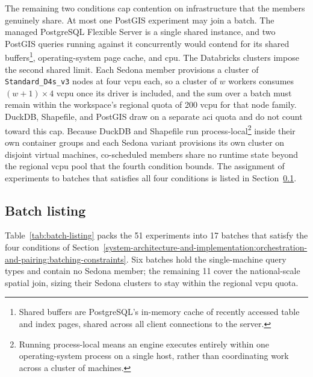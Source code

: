 The remaining two conditions cap contention on infrastructure that the members genuinely share. At most one PostGIS experiment may join a batch. The managed PostgreSQL Flexible Server is a single shared instance, and two PostGIS queries running against it concurrently would contend for its shared buffers\footnote{Shared buffers are PostgreSQL's in-memory cache of recently accessed table and index pages, shared across all client connections to the server.}, operating-system page cache, and \acrshort{cpu}. The Databricks clusters impose the second shared limit. Each Sedona member provisions a cluster of \texttt{Standard\_D4s\_v3} nodes at four \acrshort{vcpu} each, so a cluster of $w$ workers consumes $(w + 1) \times 4$ \acrshort{vcpu} once its driver is included, and the sum over a batch must remain within the workspace's regional quota of \num{200} \acrshort{vcpu} for that node family. DuckDB, Shapefile, and PostGIS draw on a separate \acrshort{aci} quota and do not count toward this cap. Because DuckDB and Shapefile run process-local\footnote{Running process-local means an engine executes entirely within one operating-system process on a single host, rather than coordinating work across a cluster of machines.} inside their own container groups and each Sedona variant provisions its own cluster on disjoint virtual machines, co-scheduled members share no runtime state beyond the regional \acrshort{vcpu} pool that the fourth condition bounds. The assignment of experiments to batches that satisfies all four conditions is listed in Section~\ref{system-architecture-and-implementation:orchestration-and-pairing:batch-listing}.

\subsection{Batch listing}
\label{system-architecture-and-implementation:orchestration-and-pairing:batch-listing}

Table~\ref{tab:batch-listing} packs the \num{51} experiments into \num{17} batches that satisfy the four conditions of Section~\ref{system-architecture-and-implementation:orchestration-and-pairing:batching-constraints}. Six batches hold the single-machine query types and contain no Sedona member; the remaining \num{11} cover the national-scale spatial join, sizing their Sedona clusters to stay within the regional \acrshort{vcpu} quota.

